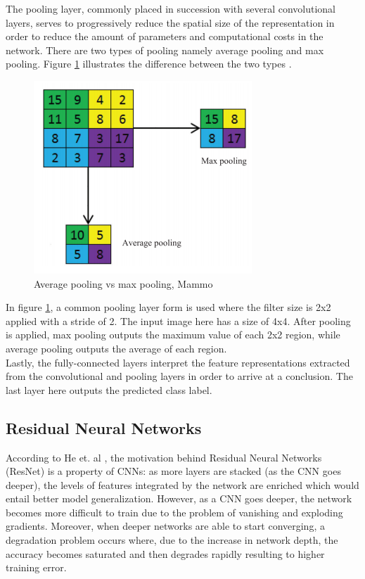 	The pooling layer, commonly placed in succession with several convolutional layers, serves to progressively reduce the spatial size of the representation in order to reduce the amount of parameters and computational costs in the network. There are two types of pooling namely average pooling and max pooling. Figure \ref{fig:poolingLayer} illustrates the difference between the two types \cite{convolutionalNeuralNetworks}. \\

\begin{figure}[h]
	\centering
  	\includegraphics[scale=0.8]{images/poolingLayer.png}
	 \caption{Average pooling vs max pooling, Mammo}
  	\label{fig:poolingLayer}
\end{figure}

	In figure \ref{fig:poolingLayer}, a common pooling layer form is used where the filter size is 2x2 applied with a stride of 2. The input image here has a size of 4x4. After pooling is applied, max pooling outputs the maximum value of each 2x2 region, while average pooling outputs the average of each region. \\

	Lastly, the fully-connected layers interpret the feature representations extracted from the convolutional and pooling layers in order to arrive at a conclusion. The last layer here outputs the predicted class label.

\subsection{Residual Neural Networks}
\qquad According to He et. al \cite{Resnet}, the motivation behind Residual Neural Networks (ResNet) is a property of CNNs: as more layers are stacked (as the CNN goes deeper), the levels of features integrated by the network are enriched which would entail better model generalization. However, as a CNN goes deeper, the network becomes more difficult to train due to the problem of vanishing and exploding gradients. Moreover, when deeper networks are able to start converging, a degradation problem occurs where, due to the increase in network depth, the accuracy becomes saturated and then degrades rapidly resulting to higher training error. \\

